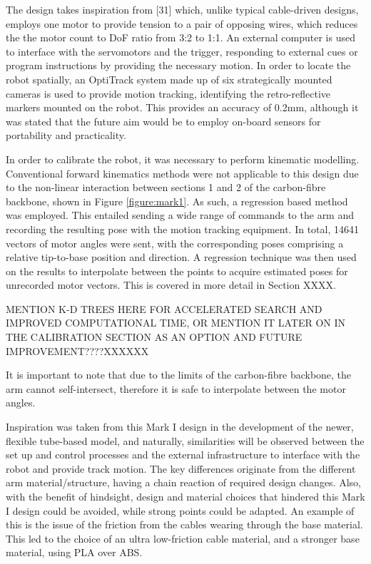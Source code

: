 \documentclass[11pt]{article}
\begin{document}
The design takes inspiration from [31] which, unlike typical cable-driven designs, employs one motor
to provide tension to a pair of opposing wires, which reduces the the motor count to DoF ratio from 3:2 to 1:1. 
An external computer is used to interface with the servomotors and the trigger, responding to external
cues or program instructions by providing the necessary motion. In order to locate the robot spatially, an OptiTrack system made up of six strategically mounted cameras is
used to provide motion tracking, identifying the retro-reflective markers mounted on the robot. This
provides an accuracy of 0.2mm, although it was stated that the future aim would be to employ
on-board sensors for portability and practicality.


In order to calibrate the robot, it was necessary to perform kinematic modelling. Conventional forward
kinematics methods were not applicable to this design due to the non-linear interaction between sections 1 and 2
of the carbon-fibre backbone, shown in Figure \ref{figure:mark1}. As such, a regression based method was employed.
This entailed sending a wide range of commands to the arm and recording the resulting pose with the
motion tracking equipment. In total, 14641 vectors of motor angles were sent, with the corresponding
poses comprising a relative tip-to-base position and direction. A regression technique
was then used on the results to interpolate between the points to acquire estimated poses for unrecorded
motor vectors. This is covered in more detail in Section XXXX.

MENTION K-D TREES HERE FOR ACCELERATED SEARCH AND IMPROVED COMPUTATIONAL TIME, OR MENTION IT LATER ON IN THE CALIBRATION SECTION AS AN OPTION AND FUTURE IMPROVEMENT????XXXXXX


It is important to note that due to the limits
of the carbon-fibre backbone, the arm cannot self-intersect, therefore it is safe to interpolate
between the motor angles.

Inspiration was taken from this Mark I design in the development of the newer, flexible tube-based model, and naturally, similarities will be observed between the set up and control processes and the external infrastructure to interface with the robot and provide track motion. The key differences originate from the different arm material/structure, having a chain reaction of required design changes. Also, with the benefit of hindsight, design and material choices that hindered this Mark I design could be avoided, while strong points could be adapted. An example of this is the issue of the friction from the cables wearing through the base material. This led to the choice of an ultra low-friction cable material, and a stronger base material, using PLA over ABS. 
\end{document}
